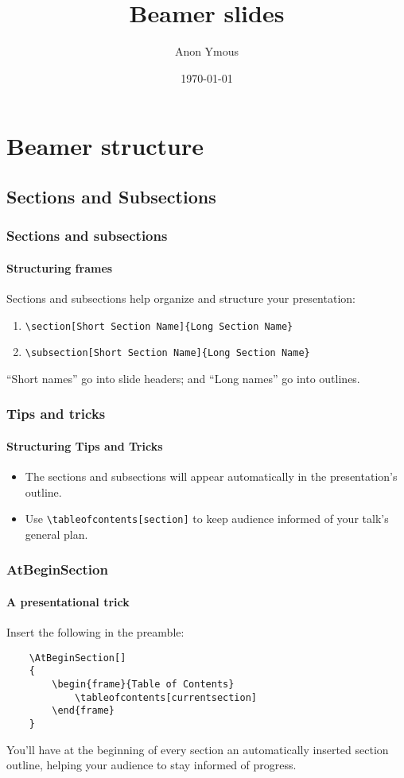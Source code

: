 \documentclass{beamer}
\author{Anon Ymous}
\date{\today}
\title{Beamer slides}
\begin{document}
\section{Beamer structure}
\subsection{Sections and Subsections}

\begin{frame}[fragile]
    \frametitle{Sections and subsections}
    \framesubtitle{Structuring frames}

    Sections and subsections help organize and structure your presentation:
    \begin{enumerate}
        \item<1-| alert@1>
        \verb`\section[Short Section Name]{Long Section Name}`
        \item<1-| alert@2>
        \verb`\subsection[Short Section Name]{Long Section Name}`
    \end{enumerate}
    \vfill
    ``Short names'' go into slide headers; and ``Long names'' go into outlines.
    \vfill
\end{frame}
\begin{frame}[fragile]
    \frametitle{Tips and tricks}
    \framesubtitle{Structuring Tips and Tricks}
    \begin{itemize}
        \item<1-| alert@1>
        The sections and subsections will appear automatically in the
        presentation's outline.
        \item<1-| alert@2>
        Use \verb`\tableofcontents[section]` to keep audience informed of
        your talk's general plan.
    \end{itemize}
\end{frame}
\begin{frame}[fragile]
    \frametitle{AtBeginSection}
    \framesubtitle{A presentational trick}

    Insert the following in the preamble:
    \begin{verbatim}
    \AtBeginSection[]
    {
        \begin{frame}{Table of Contents}
            \tableofcontents[currentsection]
        \end{frame}
    }
    \end{verbatim}

    You'll have at the beginning of every section an automatically inserted
    section outline, helping your audience to stay informed of progress.
\end{frame}
\end{document}
